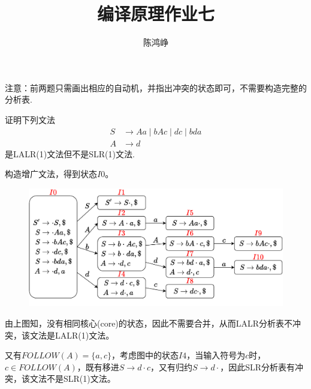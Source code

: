 \documentclass[logo,reportComp]{thesis}
\title{编译原理作业七}
\subtitle{}
\author{陈鸿峥}
\begin{document}
\maketitle

{\kaiti 注意：前两题只需画出相应的自动机，并指出冲突的状态即可，不需要构造完整的分析表.}

\begin{question}
证明下列文法
\[\begin{aligned}
S &\to Aa \mid bAc \mid dc \mid bda\\
A &\to d
\end{aligned}\]
是LALR(1)文法但不是SLR(1)文法.
\end{question}
\begin{answer}
构造增广文法，得到状态$I0$。
\begin{figure}[H]
\centering
\includegraphics[width=\linewidth]{fig/T07-1.pdf}
\end{figure}
由上图知，没有相同核心(core)的状态，因此不需要合并，从而LALR分析表不冲突，该文法是LALR(1)文法。

又有$FOLLOW(A)=\{a,c\}$，考虑图中的状态$I4$，当输入符号为$c$时，$c\in FOLLOW(A)$，既有移进$S\to d\cdot c$，又有归约$S\to d\cdot$，因此SLR分析表有冲突，该文法不是SLR(1)文法。
\end{answer}
\end{document}
